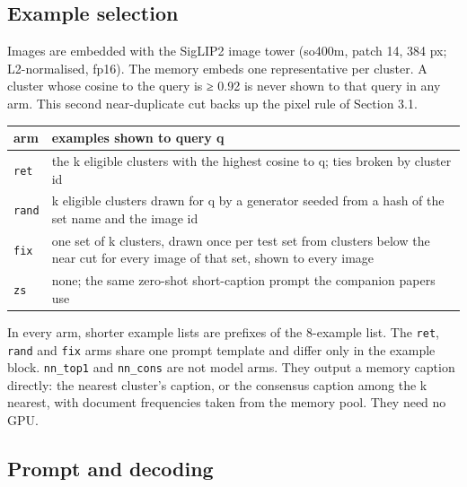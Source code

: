 \documentclass[manuscript,screen]{acmart}
\begin{document}
\subsection{Example selection}\label{example-selection}

Images are embedded with the SigLIP2 image tower \citep{Tschannen2025SigLIP2} (so400m, patch 14, 384
px; L2-normalised, fp16). The memory embeds one representative per cluster. A cluster whose cosine
to the query is ≥ 0.92 is never shown to that query in any arm. This second near-duplicate cut backs
up the pixel rule of Section 3.1.

\begin{longtable}[]{@{}
  >{\raggedright\arraybackslash}p{}
  >{\raggedright\arraybackslash}p{}@{}}
\toprule\noalign{}
\begin{minipage}[b]{\linewidth}\raggedright
arm
\end{minipage} & \begin{minipage}[b]{\linewidth}\raggedright
examples shown to query q
\end{minipage} \\
\midrule\noalign{}
\endhead
\bottomrule\noalign{}
\endlastfoot
\texttt{ret} & the k eligible clusters with the highest cosine to q; ties broken by cluster id \\
\texttt{rand} & k eligible clusters drawn for q by a generator seeded from a hash of the set name
and the image id \\
\texttt{fix} & one set of k clusters, drawn once per test set from clusters below the near cut for
every image of that set, shown to every image \\
\texttt{zs} & none; the same zero-shot short-caption prompt the companion papers use \\
\end{longtable}

In every arm, shorter example lists are prefixes of the 8-example list. The \texttt{ret},
\texttt{rand} and \texttt{fix} arms share one prompt template and differ only in the example block.
\texttt{nn\_top1} and \texttt{nn\_cons} are not model arms. They output a memory caption directly:
the nearest cluster's caption, or the consensus caption among the k nearest, with document
frequencies taken from the memory pool. They need no GPU.

\subsection{Prompt and decoding}\label{prompt-and-decoding}
\end{document}
